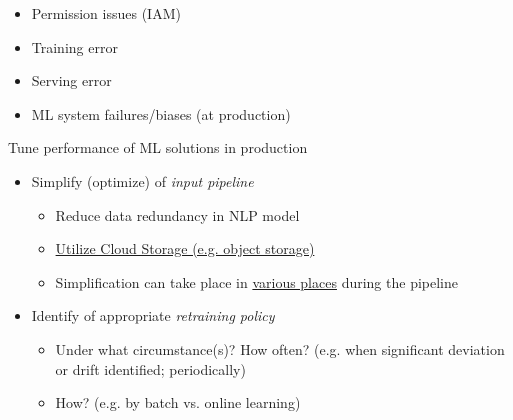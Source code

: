 \documentclass[10pt,landscape,letterpaper]{cheatsheet}
\begin{document}
\begin{multicols}{3}
\begin{itemize}
    \item Permission issues (IAM)
    \item Training error
    \item Serving error
    \item ML system failures/biases (at production)
\end{itemize}

Tune performance of ML solutions in production

\begin{itemize}
    \item Simplify (optimize) of \emph{input pipeline}
    \begin{itemize}
        \item Reduce data redundancy in NLP model
        \item \href{https://blog.westerndigital.com/machine-learning-pipeline-object-storage/}{Utilize Cloud Storage (e.g. object storage)}
        \item Simplification can take place in \href{https://towardsdatascience.com/simplify-machine-learning-workflows-e9d4f404aaeb}{various places} during the pipeline
    \end{itemize}
    \item Identify of appropriate \emph{retraining policy} %
    \begin{itemize}
        \item Under what circumstance(s)? How often? (e.g. when significant deviation or drift identified; periodically)
        \item How? (e.g. by batch vs. online learning)
    \end{itemize}
\end{itemize}

\end{multicols}
\end{document}
